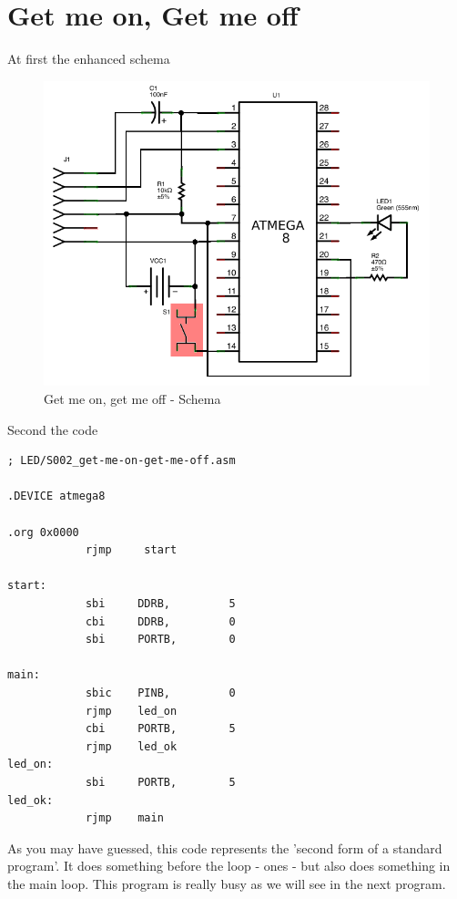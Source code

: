 \section{Get me on, Get me off}

At first the enhanced schema

\begin{figure}[htbp]
  \centering
  \includegraphics[width=120mm]{LED/S002_get-me-on-get-me-off_Circuit_schema.png}
  \caption{Get me on, get me off - Schema}
  \label{atmega8-get-me-on-get-me-off-schema}
\end{figure}


Second the code


\begin{lstlisting}
; LED/S002_get-me-on-get-me-off.asm

.DEVICE atmega8

.org 0x0000
            rjmp     start

start:
            sbi     DDRB,         5
            cbi     DDRB,         0
            sbi     PORTB,        0

main:
            sbic    PINB,         0
            rjmp    led_on
            cbi     PORTB,        5
            rjmp    led_ok
led_on:
            sbi     PORTB,        5
led_ok:
            rjmp    main
\end{lstlisting}

As you may have guessed, this code represents the 'second form of a standard program'. It does something before the loop - ones - but also does something in the main loop. This program is really busy as we will see in the next program.

